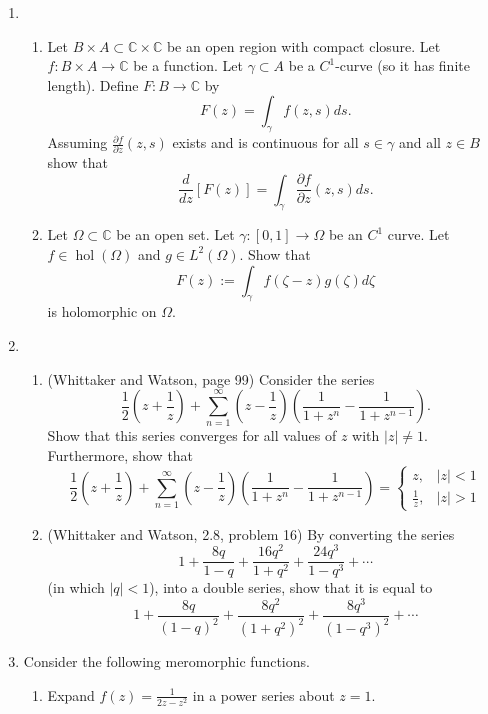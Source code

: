 \documentclass[a4paper,10pt]{article}
\newcommand{\CC}{\mathbb{C}}
\newcommand{\hol}{\operatorname{hol}}
\begin{document}
\begin{enumerate}
\item 
\begin{enumerate}
\item 
Let $B\times A \subset \CC \times \CC$ be an open region with compact closure.
Let $f: B\times A \to \CC$ be a function.  Let $\gamma \subset A$ be a $C^1$-curve (so it has finite length). 
Define $F: B \to \CC$ by  
 $$ F(z) = \int_{\gamma} f(z,s) ds.$$
Assuming $\frac{\partial f}{\partial z}(z,s)$ exists and is continuous for all $s \in \gamma$ and all $z \in B$ show that 
 $$ \frac{d}{dz}[ F(z)] = \int_{\gamma} \frac{\partial f}{\partial z}(z,s) ds. $$
\item Let $\Omega \subset \CC$ be an open set. Let $\gamma:[0,1]\to \Omega$ be an $C^1$ curve. 
Let $f \in \hol(\Omega)$ and $g \in L^2(\Omega)$. Show that 
 $$ F(z) := \int_{\gamma} f(\zeta-z)g(\zeta)d \zeta $$ 
is holomorphic on $\Omega$.
\end{enumerate}


\item 
\begin{enumerate}
\item (Whittaker and Watson, page 99)
Consider the series 
 $$ \frac{1}{2} \left( z + \frac{1}{z} \right) + \sum_{n=1}^\infty \left( z - \frac{1}{z} \right) \left( \frac{1}{1+z^n} - \frac{1}{1+z^{n-1}} \right). $$
Show that this series converges for all values of $z$ with $\vert z \vert \neq 1$. 
Furthermore, show that 
$$ \frac{1}{2} \left( z + \frac{1}{z} \right) + \sum_{n=1}^\infty \left( z - \frac{1}{z} \right) \left( \frac{1}{1+z^n} - \frac{1}{1+z^{n-1}} \right) = \begin{cases}
z, & \vert z \vert <1 \\
\frac{1}{z}, & \vert z \vert > 1
\end{cases}$$

\item (Whittaker and Watson, 2.8, problem 16)
By converting the series 
 $$1 + \frac{8q}{1-q} + \frac{16q^2}{1+q^2} + \frac{24q^3}{1-q^3} + \cdots $$ 
(in which $\vert q \vert<1$), into a double series, show that it is equal to 
 $$ 1 + \frac{8q}{(1-q)^2}+ \frac{8q^2}{(1+q^2)^2} + \frac{8q^3}{(1-q^3)^2} + \cdots $$
 \end{enumerate}	
 	
 	\item Consider the following meromorphic functions.
 	
 	\begin{enumerate}
 		\item Expand $f(z) = \frac{1}{2z - z^2}$ in a power series about $z = 1$.
 		

\end{enumerate}
\end{enumerate}
\end{document}
